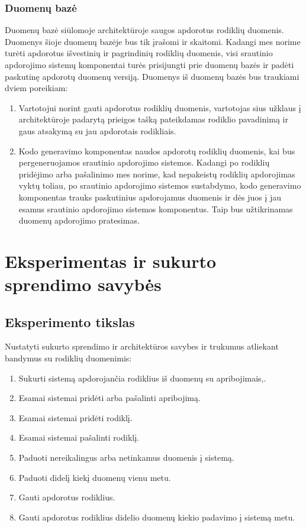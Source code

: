 \documentclass{VUMIFPSbakalaurinis}
\begin{document}
\subsubsection{Duomenų bazė}

Duomenų bazė siūlomoje architektūroje saugos apdorotus rodiklių duomenis. Duomenys šioje duomenų bazėje bus tik įrašomi ir skaitomi. Kadangi mes norime turėti apdorotus išvestinių ir pagrindinių rodiklių duomenis, visi srautinio apdorojimo sistemų komponentai turės prisijungti prie duomenų bazės ir padėti paskutinę apdorotų duomenų versiją. Duomenys iš duomenų bazės bus traukiami dviem poreikiam: 
\begin{enumerate}
    \item Vartotojui norint gauti apdorotus rodiklių duomenis, vartotojas sius užklaus į architektūroje padarytą prieigos tašką pateikdamas rodiklio pavadinimą ir gaus atsakymą su jau apdorotais rodikliais. 
    \item Kodo generavimo komponentas naudos apdorotų rodiklių duomenis, kai bus pergeneruojamos srautinio apdorojimo sistemos.  Kadangi po rodiklių pridėjimo arba pašalinimo mes norime, kad nepakeistų rodiklių apdorojimas vyktų toliau, po srautinio apdorojimo sistemos sustabdymo, kodo generavimo komponentas trauks paskutinius apdorojamus duomenis ir dės juos į jau esamus srautinio apdorojimo sistemos komponentus. Taip bus užtikrinamas duomenų apdorojimo pratesimas.   
\end{enumerate}  


\section{Eksperimentas ir sukurto sprendimo savybės}

\subsection{Eksperimento tikslas}

Nustatyti sukurto sprendimo ir architektūros savybes ir trukumus atliekant bandymus su rodiklių duomenimis:
\begin{enumerate}
    \item Sukurti sistemą apdorojančia rodiklius iš duomenų su apribojimais,.
    \item Esamai sistemai pridėti arba pašalinti apribojimą.
    \item Esamai sistemai pridėti rodiklį.
    \item Esamai sistemai pašalinti rodiklį. 
    \item Paduoti nereikalingus arba netinkamus duomenis į sistemą.
    \item Paduoti didelį kiekį duomenų vienu metu.
    \item Gauti apdorotus rodiklius.
    \item Gauti apdorotus rodiklius didelio duomenų kiekio padavimo į sistemą metu.
\end{enumerate}
\end{document}
